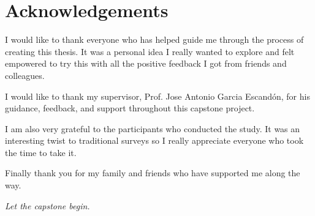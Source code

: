 \section*{Acknowledgements}
\thispagestyle{empty}


I would like to thank everyone who has helped guide me through the process of creating this thesis. It was a personal idea I really wanted to explore and felt empowered to try this with all the positive feedback I got from friends and colleagues.

I would like to thank my supervisor, Prof. Jose Antonio Garcia Escand\'on, for his guidance, feedback, and support throughout this capstone project. 

I am also very grateful to the participants who conducted the study. It was an interesting twist to traditional surveys so I really appreciate everyone who took the time to take it.

Finally thank you for my family and friends who have supported me along the way.

\noindent \textit{Let the capstone begin.}
